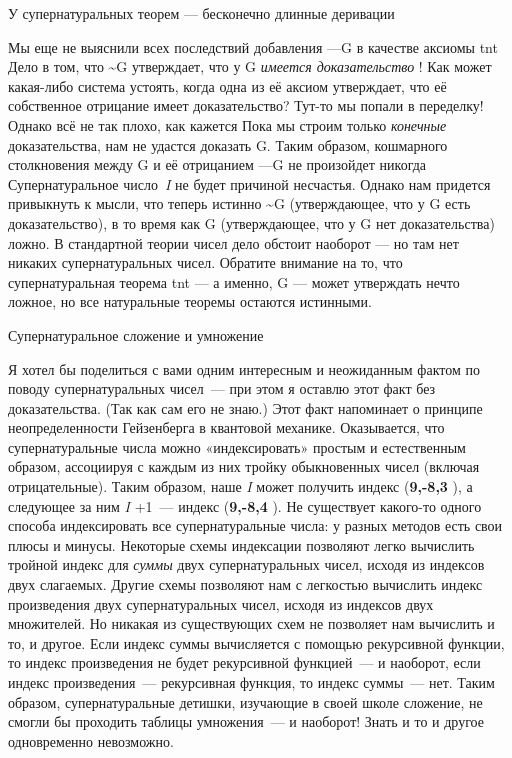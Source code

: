 \documentclass[../main.tex]{subfiles}
\begin{document}
У супернатуральных теорем --- бесконечно длинные деривации

Мы еще не выяснили всех последствий добавления ---G в качестве аксиомы \acs{tnt} Дело в том, что \textasciitilde G утверждает, что у G \emph{имеется доказательство} ! Как может какая-либо система устоять, когда одна из её аксиом утверждает, что её собственное отрицание имеет доказательство? Тут-то мы попали в переделку! Однако всё не так плохо, как кажется Пока мы строим только \emph{конечные} доказательства, нам не удастся доказать G. Таким образом, кошмарного столкновения между G и её отрицанием ---G не произойдет никогда Супернатуральное число~\emph{I} не будет причиной несчастья. Однако нам придется привыкнуть к мысли, что теперь истинно \textasciitilde G (утверждающее, что у G есть доказательство), в то время как G (утверждающее, что у G нет доказательства) ложно. В стандартной теории чисел дело обстоит наоборот --- но там нет никаких супернатуральных чисел. Обратите внимание на то, что супернатуральная теорема \acs{tnt} --- а именно, G --- может утверждать нечто ложное, но все натуральные теоремы остаются истинными.

Супернатуральное сложение и умножение

Я хотел бы поделиться с вами одним интересным и неожиданным фактом по поводу супернатуральных чисел~--- при этом я оставлю этот факт без доказательства. (Так как сам его не знаю.) Этот факт напоминает о принципе неопределенности Гейзенберга в квантовой механике. Оказывается, что супернатуральные числа можно «индексировать» простым и естественным образом, ассоциируя с каждым из них тройку обыкновенных чисел (включая отрицательные). Таким образом, наше \emph{I} может получить индекс (\textbf{9,-8,3} ), а следующее за ним \emph{I} +1~--- индекс (\textbf{9,-8,4} ). Не существует какого-то одного способа индексировать все супернатуральные числа: у разных методов есть свои плюсы и минусы. Некоторые схемы индексации позволяют легко вычислить тройной индекс для \emph{суммы} двух супернатуральных чисел, исходя из индексов двух слагаемых. Другие схемы позволяют нам с легкостью вычислить индекс произведения двух супернатуральных чисел, исходя из индексов двух множителей. Но никакая из существующих схем не позволяет нам вычислить и то, и другое. Если индекс суммы вычисляется с помощью рекурсивной функции, то индекс произведения не будет рекурсивной функцией~--- и наоборот, если индекс произведения~--- рекурсивная функция, то индекс суммы~--- нет. Таким образом, супернатуральные детишки, изучающие в своей школе сложение, не смогли бы проходить таблицы умножения~--- и наоборот! Знать и то и другое одновременно невозможно.
\end{document}

